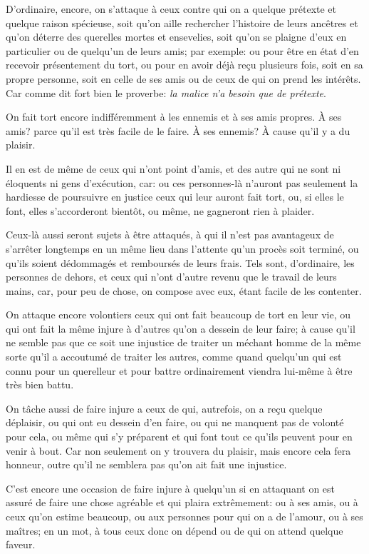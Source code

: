 D'ordinaire, encore, on s'attaque à ceux contre qui on a quelque prétexte et quelque raison spécieuse, soit qu'on
aille rechercher l'histoire de leurs ancêtres et qu'on déterre des querelles mortes et ensevelies, soit qu'on se
plaigne d'eux en particulier ou de quelqu'un de leurs amis; par exemple: ou pour être en état d'en recevoir
présentement du tort, ou pour en avoir déjà reçu plusieurs fois, soit en sa propre personne, soit en celle de ses
amis ou de ceux de qui on prend les intérêts. Car comme dit fort bien le proverbe: \emph{la malice n'a besoin que
de prétexte}.

On fait tort encore indifféremment à les ennemis et à ses amis propres. À ses amis? parce qu'il est très facile de
le faire. À ses ennemis? À cause qu'il y a du plaisir.

Il en est de même de ceux qui n'ont point d'amis, et des autre qui ne sont ni éloquents ni gens d'exécution, car:
ou ces personnes-là n'auront pas seulement la hardiesse de poursuivre en justice ceux qui leur auront fait tort,
ou, si elles le font, elles s'accorderont bientôt, ou même, ne gagneront rien à plaider.

Ceux-là aussi seront sujets à être attaqués, à qui il n'est pas avantageux de s'arrêter longtemps en un même lieu
dans l'attente qu'un procès soit terminé, ou qu'ils soient dédommagés et remboursés de leurs frais. Tels sont,
d'ordinaire, les personnes de dehors, et ceux qui n'ont d'autre revenu que le travail de leurs mains, car, pour
peu de chose, on compose avec eux, étant facile de les contenter.

On attaque encore volontiers ceux qui ont fait beaucoup de tort en leur vie, ou qui ont fait la même injure à
d'autres qu'on a dessein de leur faire; à cause qu'il ne semble pas que ce soit une injustice de traiter un méchant
homme de la même sorte qu'il a accoutumé de traiter les autres, comme quand quelqu'un qui est connu pour un
querelleur et pour battre ordinairement viendra lui-même à être très bien battu.

On tâche aussi de faire injure a ceux de qui, autrefois, on a reçu quelque déplaisir, ou qui ont eu dessein d'en
faire, ou qui ne manquent pas de volonté pour cela, ou même qui s'y préparent et qui font tout ce qu'ils peuvent
pour en venir à bout. Car non seulement on y trouvera du plaisir, mais encore cela fera honneur, outre qu'il ne
semblera pas qu'on ait fait une injustice.

C'est encore une occasion de faire injure à quelqu'un si en attaquant on est assuré de faire une chose agréable
et qui plaira extrêmement: ou à ses amis, ou à ceux qu'on estime beaucoup, ou aux personnes pour qui on a de
l'amour, ou à ses maîtres; en un mot, à tous ceux donc on dépend ou de qui on attend quelque faveur.

